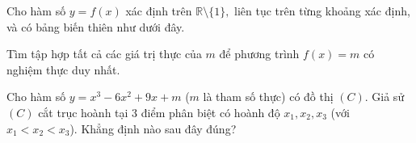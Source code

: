 \begin{ex}%
Cho hàm số $y=f(x)$ xác định trên $\mathbb{R}\setminus \{1\},$ liên tục trên từng khoảng xác định, và có bảng biến thiên như dưới đây.
\begin{center}
\end{center}
Tìm tập hợp tất cả các giá trị thực của $m$ để phương trình $f(x)=m$ có nghiệm thực duy nhất.
\choice{$[0;+\infty)\cup \{-1\}$}{\True $(0;+\infty)\cup \{-1\}$}{$(0;+\infty)$}{$[0;+\infty)$}
\end{ex}
\begin{ex}%
Cho hàm số $y=x^3-6x^2+9x+m$ ($m$ là tham số thực) có đồ thị $(C)$. Giả sử $(C)$ cắt trục hoành tại 3 điểm phân biệt có hoành độ $x_1,x_2,x_3$ (với $x_1<x_2<x_3$). Khẳng định nào sau đây đúng?
\end{ex}
